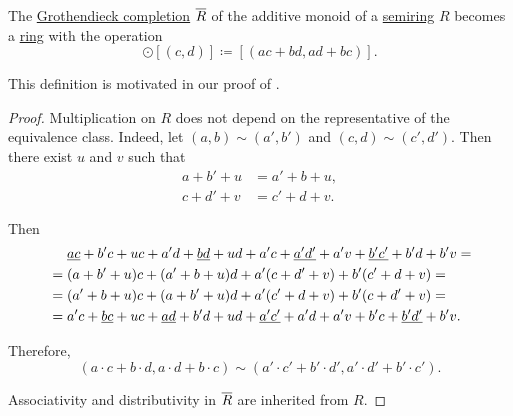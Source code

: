 \begin{proposition}\label{thm:grothendieck_semiring_completion}
  The \hyperref[def:monoid_grothendieck_completion]{Grothendieck completion} \( \oline{R} \) of the additive monoid of a \hyperref[def:semiring]{semiring} \( R \) becomes a \hyperref[def:ring]{ring} with the operation
  \begin{equation*}
    [(a, b)] \odot [(c, d)] \coloneqq [(ac + bd, ad + bc)].
  \end{equation*}
\end{proposition}
\begin{comments}
  \item This definition is motivated in our proof of .
\end{comments}
\begin{proof}
  Multiplication on \( R \) does not depend on the representative of the equivalence class. Indeed, let \( (a, b) \sim (a', b') \) and \( (c, d) \sim (c', d') \). Then there exist \( u \) and \( v \) such that
  \begin{align*}
    a + b' + u &= a' + b + u, \\
    c + d' + v &= c' + d + v.
  \end{align*}

  Then
  \begin{align*}
    &\phantom{{}={}}
    \hi{ac} + b'c + uc + a'd + \hi{bd} + ud + a'c + \hi{a'd'} + a'v + \hi{b'c'} + b'd + b'v
    = \\ &=
    (a + b' + u)c + (a' + b + u)d + a'(c + d' + v) + b'(c' + d + v)
    = \\ &=
    (a' + b + u)c + (a + b' + u)d + a'(c' + d + v) + b'(c + d' + v)
    = \\ &=
    a'c + \hi{bc} + uc + \hi{ad} + b'd + ud + \hi{a'c'} + a'd + a'v + b'c + \hi{b'd'} + b'v.
  \end{align*}

  Therefore,
  \begin{equation*}
    (a \cdot c + b \cdot d, a \cdot d + b \cdot c) \sim (a' \cdot c' + b' \cdot d', a' \cdot d' + b' \cdot c').
  \end{equation*}

  Associativity and distributivity in \( \oline{R} \) are inherited from \( R \).
\end{proof}

